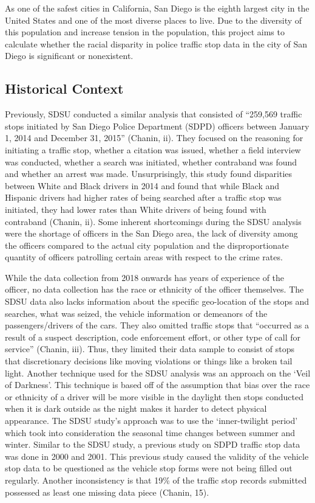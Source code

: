 \documentclass[11pt]{article}
\begin{document}
    As one of the safest cities in California, San Diego is the eighth
largest city in the United States and one of the most diverse places to
live. Due to the diversity of this population and increase tension in
the population, this project aims to calculate whether the racial
disparity in police traffic stop data in the city of San Diego is
significant or nonexistent.

    \subsection{Historical Context}\label{historical-context}

    Previously, SDSU conducted a similar analysis that consisted of
``259,569 traffic stops initiated by San Diego Police Department (SDPD)
officers between January 1, 2014 and December 31, 2015'' (Chanin, ii).
They focused on the reasoning for initiating a traffic stop, whether a
citation was issued, whether a field interview was conducted, whether a
search was initiated, whether contraband was found and whether an arrest
was made. Unsurprisingly, this study found disparities between White and
Black drivers in 2014 and found that while Black and Hispanic drivers
had higher rates of being searched after a traffic stop was initiated,
they had lower rates than White drivers of being found with contraband
(Chanin, ii). Some inherent shortcomings during the SDSU analysis were
the shortage of officers in the San Diego area, the lack of diversity
among the officers compared to the actual city population and the
disproportionate quantity of officers patrolling certain areas with
respect to the crime rates.

    While the data collection from 2018 onwards has years of experience of
the officer, no data collection has the race or ethnicity of the officer
themselves. The SDSU data also lacks information about the specific
geo-location of the stops and searches, what was seized, the vehicle
information or demeanors of the passengers/drivers of the cars. They
also omitted traffic stops that ``occurred as a result of a suspect
description, code enforcement effort, or other type of call for
service'' (Chanin, iii). Thus, they limited their data sample to consist
of stops that discretionary decisions like moving violations or things
like a broken tail light. Another technique used for the SDSU analysis
was an approach on the `Veil of Darkness'. This technique is based off
of the assumption that bias over the race or ethnicity of a driver will
be more visible in the daylight then stops conducted when it is dark
outside as the night makes it harder to detect physical appearance. The
SDSU study's approach was to use the `inner-twilight period' which took
into consideration the seasonal time changes between summer and winter.
Similar to the SDSU study, a previous study on SDPD traffic stop data
was done in 2000 and 2001. This previous study caused the validity of
the vehicle stop data to be questioned as the vehicle stop forms were
not being filled out regularly. Another inconsistency is that 19\% of
the traffic stop records submitted possessed as least one missing data
piece (Chanin, 15).
\end{document}
